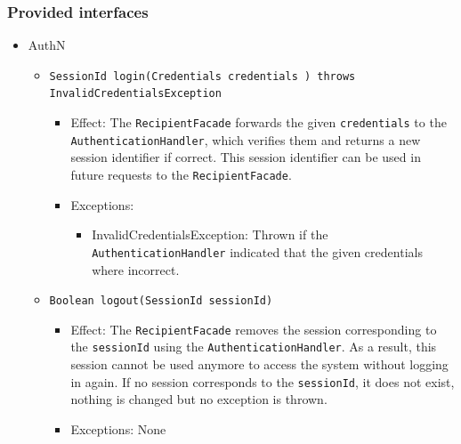 \documentclass[a4paper,10pt]{article}
\begin{document}
\subsubsection*{Provided interfaces}
\begin{itemize}
    \item AuthN
    \begin{itemize}
        \item \texttt{SessionId login(Credentials credentials ) throws InvalidCredentialsException}
        \begin{itemize}
            \item Effect: The \texttt{RecipientFacade} forwards the given \texttt{credentials} to the \texttt{AuthenticationHandler}, which verifies them and returns a new session identifier if correct. This session identifier can be used in future requests to the \texttt{RecipientFacade}.
            \item Exceptions:
            \begin{itemize}
                \item InvalidCredentialsException: Thrown if the \texttt{AuthenticationHandler} indicated that the given credentials where incorrect.
            \end{itemize}
		\end{itemize}
		
        \item \texttt{Boolean logout(SessionId sessionId)}
            \begin{itemize}
                \item Effect: The \texttt{RecipientFacade} removes the session corresponding to the \texttt{sessionId} using the \texttt{AuthenticationHandler}. As a result, this session cannot be used anymore to access the system without logging in again. If no session corresponds to the \texttt{sessionId}, it does not exist, nothing is changed but no exception is thrown.
                \item Exceptions: None
            \end{itemize}
            

\end{itemize}
\end{itemize}
\end{document}
